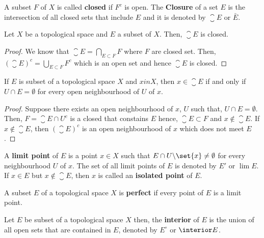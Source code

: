 \begin{definition}
    A subset \(F\) of \(X\) is called \textbf{closed} if \(F^c\) is open. The \textbf{Closure} of a set \(E\) is the intersection of all closed sets that include \(E\) and it is denoted by \(\closure E\) or \(\bar{E}\).
\end{definition}

\begin{proposition}
    Let \(X\) be a topological space and \(E\) a subset of \(X\). Then, \(\closure E\) is closed.
\end{proposition}

\begin{proof}
    We know that \(\closure E = \bigcap_{E \subset F} F\) where \(F\) are closed set. Then, \((\closure E)^c = \bigcup_{E \subset F} F^c\) which is an open set and hence \(\closure E\) is closed.
\end{proof}

\begin{proposition}
    If \(E\) is subset of a topological space \(X\) and \(x in X\), then \(x \in \closure E\) if and only if \(U \cap E = \emptyset\) for every open neighbourhood of \(U\) of \(x\).
\end{proposition}

\begin{proof}
    Suppose there exists an open neighbourhood of \(x\), \(U\) such that, \(U \cap E = \emptyset\). Then, \(F = \closure E \cap U^c\) is a closed that constains \(E\) hence, \(\closure E \subset F\) and \(x \notin \closure E\). If \(x \notin \closure E\), then \((\closure E)^c\) is an open neighbourhood of \(x\) which does not meet \(E\).
\end{proof}

\begin{definition}
    A \textbf{limit point} of \(E\) is a point \(x \in X\) such that \(E \cap U \backslash \set{x} \neq \emptyset\) for every neighbourhood \(U\) of \(x\). The set of all limit points of \(E\) is denoted by \(E'\) or \(\lim E\). If \(x \in E\) but \(x \notin \closure E\), then \(x\) is called an \textbf{isolated point} of \(E\).
\end{definition}

\begin{definition}
    A subset \(E\) of a topological space \(X\) is \textbf{perfect} if every point of \(E\) is a limit point.
\end{definition}

\begin{definition}
    Let \(E\) be subset of a topological space \(X\) then, the \textbf{interior} of \(E\) is the union of all open sets that are contained in \(E\), denoted by \(E^{\circ}\) or \(\interior E\).
\end{definition}

